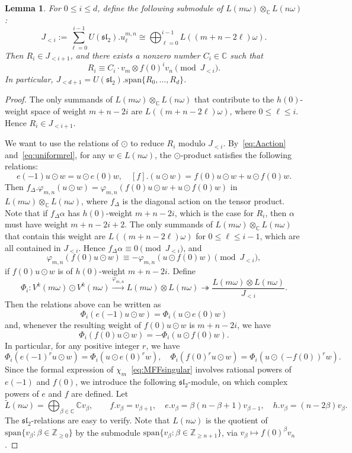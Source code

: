 \documentclass[12pt,a4paper,reqno]{amsart}
\numberwithin{equation}{section}
\newtheorem{lemma}[theorem]{Lemma}
\theoremstyle{definition}
\renewcommand{\sl}{\mathfrak{sl}}
\newcommand{\C}{\mathbb{C}}
\newcommand{\Z}{\mathbb{Z}}
\def \al{\alpha}
\def \b{\beta}
\def\spn{\mathrm{span}}
\def\om{\omega}
\def\o{\otimes}
\def\ds{\dots}
\begin{document}
\begin{lemma}\label{lm:6.4}
For $0\leq i\leq d$, define the following submodule of $L(m\om)\o_\C L(n\om)$:
\[
J_{<i}:=\sum_{\ell=0}^{i-1} U(\sl_2).u^{m,n}_\ell\cong \bigoplus_{\ell=0}^{i-1} L((m+n-2\ell)\om).
\]
Then $R_i\in J_{<i+1}$, and
there exists a nonzero number $C_i\in \C$ such that
\begin{equation}\label{eq:Ricongruence}
R_i\equiv C_i \cdot v_m\o f(0)^iv_n\pmod{J_{<i}}.
\end{equation}
In particular, $J_{<d+1}=U(\sl_2).\spn\{R_0,\ds, R_d\}$.
\end{lemma}
\begin{proof}
The only summands of $L(m\om)\o_\C L(n\om)$ that contribute to the $h(0)$-weight space of weight $m+n-2i$ are $L((m+n-2\ell)\om)$, where $0\leq \ell\leq i$. Hence $R_i\in J_{<i+1}$.

We want to use the relations of $\odot$ to reduce $R_i$ modulo $J_{<i}$.
By~\eqref{eq:Aaction} and~\eqref{eq:uniformrel}, for any $w\in L(n\om)$, the $\odot$-product satisfies the following relations:
\[
e(-1)u\odot w=u\odot e(0)w,\quad [f].(u\odot w)=f(0)u\odot w+u\odot f(0)w.
\]
Then $f_{\Delta}.\varphi_{m,n}(u\odot w)=\varphi_{m,n}(f(0)u\odot w+u\odot f(0)w)$ in $L(m\om)\o_\C L(n\om)$, where $f_\Delta$ is the diagonal action on the tensor product.
Note that if $f_\Delta \al$ has $h(0)$-weight $m+n-2i$, which is the case for $R_{i}$, then $\al$ must have weight $m+n-2i+2$. The only summands of $L(m\om)\o_\C L(n\om)$ that contain this weight are $L((m+n-2\ell)\om)$ for $0\leq \ell\leq i-1$, which are all contained in $J_{<i}$. Hence $f_\Delta\al\equiv 0\pmod{J_{<i}}$, and
\[
\varphi_{m,n}(f(0)u\odot w)\equiv -\varphi_{m,n}(u\odot f(0)w)\pmod{J_{<i}},
\]
if $f(0)u\odot w$ is of $h(0)$-weight $m+n-2i$. Define
\[
\Phi_i:
V^k(m\omega)\odot V^k(n\omega)
\xrightarrow{\varphi_{m,n}}
L(m\omega)\otimes L(n\omega)
\twoheadrightarrow \frac{L(m\omega)\otimes L(n\omega)}{J_{<i}}.
\]
Then the relations above can be written as
\[
\Phi_i(e(-1)u\odot w)
=
\Phi_i(u\odot e(0)w)
\] and, whenever the resulting weight of $f(0)u\odot w$ is $m+n-2i$, we have
\[
\Phi_i(f(0)u\odot w)
=
-\Phi_i(u\odot f(0)w).
\]
In particular, for any positive integer $r$, we have
\begin{equation}\label{eq:tworel}
\Phi_i(e(-1)^ru\odot w)=\Phi_i(u\odot e(0)^rw),\quad
\Phi_i(f(0)^ru\odot w)=\Phi_i(u\odot (-f(0))^rw).
\end{equation}
Since the formal expression of $\chi_m$~\eqref{eq:MFFsingular} involves rational powers of $e(-1)$ and $f(0)$, we introduce the following $\sl_2$-module, on which complex powers of $e$ and $f$ are defined. Let
\[
\tilde{L}(n\om)=\bigoplus_{\b\in \C} \C v_\b,\qquad
f.v_\b=v_{\b+1},\quad e.v_\b=\b(n-\b+1)v_{\b-1},\quad h.v_\b=(n-2\b)v_\b.
\]
The $\sl_2$-relations are easy to verify.
Note that $L(n\om)$ is the quotient of $\spn\{v_\b:\b\in \Z_{\geq 0}\}$ by the submodule $\spn\{v_\b:\b\in \Z_{\geq n+1}\}$, via $v_\b\mapsto f(0)^\b v_n$.


\end{proof}
\end{document}

